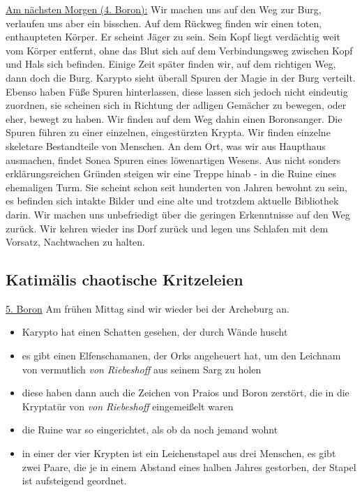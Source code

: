 \underline{Am nächsten Morgen (4. Boron):}
Wir machen uns auf den Weg zur Burg, verlaufen uns aber ein bisschen. Auf dem Rückweg finden wir einen toten, enthaupteten Körper. Er scheint Jäger zu sein. Sein Kopf liegt verdächtig weit vom Körper entfernt, ohne das Blut sich auf dem Verbindungsweg zwischen Kopf und Hals sich befinden. Einige Zeit später finden wir, auf dem richtigen Weg, dann doch die Burg.
Karypto sieht überall Spuren der Magie in der Burg verteilt. Ebenso haben Füße Spuren hinterlassen, diese lassen sich jedoch nicht eindeutig zuordnen, sie scheinen sich in Richtung der adligen Gemächer zu bewegen, oder eher, bewegt zu haben. Wir finden auf dem Weg dahin einen Boronsanger. Die Spuren führen zu einer einzelnen, eingestürzten Krypta. Wir finden einzelne skeletare Bestandteile von Menschen. An dem Ort, was wir aus Haupthaus ausmachen, findet Sonea Spuren eines löwenartigen Wesens. Aus nicht sonders erklärungsreichen Gründen steigen wir eine Treppe hinab - in die Ruine eines ehemaligen Turm. Sie scheint schon seit hunderten von Jahren bewohnt zu sein, es befinden sich intakte Bilder und eine alte und trotzdem aktuelle Bibliothek darin. Wir machen uns unbefriedigt über die geringen Erkenntnisse auf den Weg zurück. Wir kehren wieder ins Dorf zurück und legen uns Schlafen mit dem Vorsatz, Nachtwachen zu halten.

\subsection{Katimälis chaotische Kritzeleien}
\underline{5. Boron} Am frühen Mittag sind wir wieder bei der Archeburg an.
\begin{itemize}
\item Karypto hat einen Schatten gesehen, der durch Wände huscht
\item es gibt einen Elfenschamanen, der Orks angeheuert hat, um den Leichnam von vermutlich \emph{von Riebeshoff} aus seinem Sarg zu holen
\item diese haben dann auch die Zeichen von Praios und Boron zerstört, die in die Kryptatür von \emph{von Riebeshoff} eingemeißelt waren 
\item die Ruine war so eingerichtet, als ob da noch jemand wohnt
\item in einer der vier Krypten ist ein Leichenstapel aus drei Menschen, es gibt zwei Paare, die je in einem Abstand eines halben Jahres gestorben, der Stapel ist aufsteigend geordnet.  
\end{itemize}

